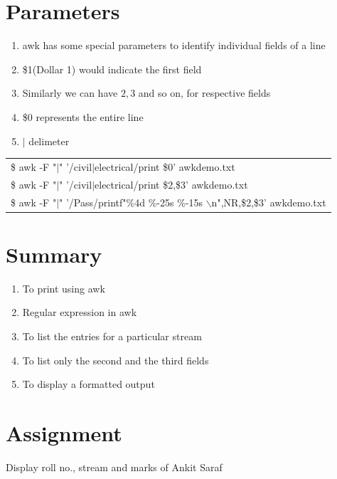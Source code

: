 \documentclass[12pt, a4paper]{report}
\begin{document}
\section{Parameters}
\begin{enumerate}
\item awk has some special parameters to identify individual fields of a line
\item \$1(Dollar 1) would indicate the first field
\item Similarly we can have $2, $3 and so on, for respective fields
\item \$0 represents the entire line
\item $|$   delimeter
\end{enumerate}
\begin{tabular}{|l|} \hline
\$ awk -F "$|$" '/civil$|$electrical/{print \$0}' awkdemo.txt\\
\$ awk -F "$|$" '/civil$|$electrical/{print \$2,\$3}' awkdemo.txt\\
\$ awk -F "$|$" '/Pass/{printf"\%4d \%-25s \%-15s $\backslash$n",NR,\$2,\$3}' awkdemo.txt\\ \hline
\end{tabular}
\section{Summary}
\begin{enumerate}
\item To print using awk
\item Regular expression in awk
\item To list the entries for a particular stream
\item To list only the second and the third fields
\item To display a formatted output
\end{enumerate}
\section{Assignment}
Display roll no., stream and marks of Ankit Saraf
\end{document}
